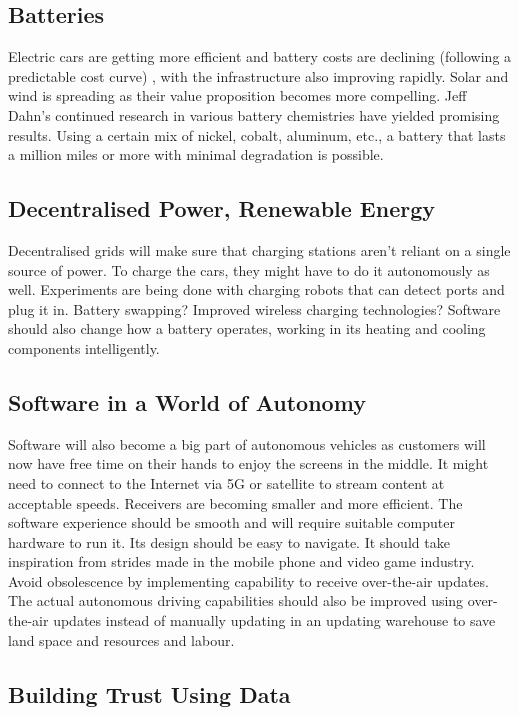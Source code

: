 \documentclass{article}
\begin{document}
\subsection{Batteries}

Electric cars are getting more efficient and battery costs are declining (following a predictable cost curve) , with the infrastructure also improving rapidly. Solar and wind is spreading as their value proposition becomes more compelling. Jeff Dahn’s continued research in various battery chemistries have yielded promising results. Using a certain mix of nickel, cobalt, aluminum, etc., a battery that lasts a million miles or more with minimal degradation is possible.  

\subsection{Decentralised Power, Renewable Energy}

Decentralised grids will make sure that charging stations aren’t reliant on a single source of power. To charge the cars, they might have to do it autonomously as well. Experiments are being done with charging robots that can detect ports and plug it in. Battery swapping? Improved wireless charging technologies? Software should also change how a battery operates, working in its heating and cooling components intelligently. 

\subsection{Software in a World of Autonomy}

Software will also become a big part of autonomous vehicles as customers will now have free time on their hands to enjoy the screens in the middle. It might need to connect to the Internet via 5G or satellite to stream content at acceptable speeds. Receivers are becoming smaller and more efficient. The software experience should be smooth and will require suitable computer hardware to run it. Its design should be easy to navigate. It should take inspiration from strides made in the mobile phone and video game industry. Avoid obsolescence by implementing capability to receive over-the-air updates. The actual autonomous driving capabilities should also be improved using over-the-air updates instead of manually updating in an updating warehouse to save land space and resources and labour. 

\subsection{Building Trust Using Data}
\end{document}
